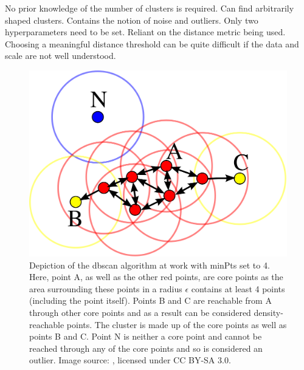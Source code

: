 \begin{itemize}
    \pro No prior knowledge of the number of clusters is required.
    \pro Can find arbitrarily shaped clusters.
    \pro Contains the notion of noise and outliers.
    \pro Only two hyperparameters need to be set.
    \con Reliant on the distance metric being used.
    \con Choosing a meaningful distance threshold can be quite difficult if the data and scale are not well understood.
\end{itemize}

\begin{figure}[H]
    \centering
    \includegraphics[width=\textwidth]{Images/Chapter 3/DBSCAN/DBSCAN-Illustration.png}
    \caption{Depiction of the \gls{dbscan} algorithm at work with minPts set to 4. Here, point A, as well as the other red points, are core points as the area surrounding these points in a radius $\epsilon$ contains at least 4 points (including the point itself). Points B and C are reachable from A through other core points and as a result can be considered density-reachable points. The cluster is made up of the core points as well as points B and C. Point N is neither a core point and cannot be reached through any of the core points and so is considered an outlier. Image source: \cite{Wikipedia_DBSCAN}, licensed under CC BY-SA 3.0.}
    \label{fig:DBSCAN-Illustration}
\end{figure}

